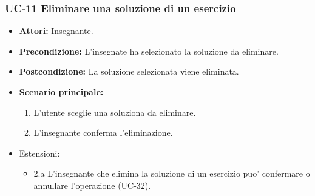 \subsubsection{UC-11 Eliminare una soluzione di un esercizio}
\begin{itemize}
\item \textbf{Attori: }Insegnante.
		\item \textbf{Precondizione: }L'insegnate ha selezionato la soluzione da eliminare.
		\item \textbf{Postcondizione: }La soluzione selezionata viene eliminata. 
		\item \textbf{Scenario principale: }
		\begin{enumerate}
		\item L'utente sceglie una soluziona da eliminare.
		\item L'insegnante conferma l'eliminazione.
		\end{enumerate}
	\item Estensioni:
	\begin{itemize}
	\item 2.a L'insegnante che elimina la soluzione di un esercizio puo' confermare o annullare l'operazione (UC-32).
	\end{itemize}
	\end{itemize}

